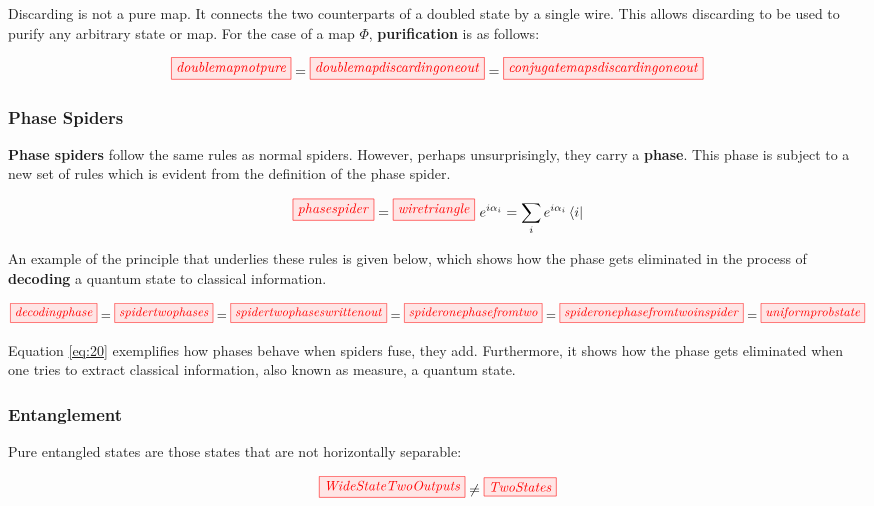 \documentclass[]{article}
\begin{document}
Discarding is not a pure map. It connects the two counterparts of a doubled state by a single wire. This allows discarding to be used to purify any arbitrary state or map. For the case of a map $\Phi$, \textbf{purification} is as follows:

\begin{equation}
\tikzfig{doublemapnotpure} = \tikzfig{doublemapdiscardingoneout} = \tikzfig{conjugatemapsdiscardingoneout}
\end{equation}



\subsubsection{Phase Spiders}
\label{phasespiders}

\textbf{Phase spiders} follow the same rules as normal spiders. However, perhaps unsurprisingly, they carry a \textbf{phase}. This phase is subject to a new set of rules which is evident from the definition of the phase spider. 

\begin{equation}
\label{phasespider}
\tikzfig{phasespider} = \tikzfig{wiretriangle}~e^{i\alpha_i} = \sum\limits_i e^{i\alpha_i} \bra{i}
\end{equation}

An example of the principle that underlies these rules is given below, which shows how the phase gets eliminated in the process of \textbf{decoding} a quantum state to classical information.


\begin{equation}
\label{eq:20}
\tikzfig{decodingphase} = \tikzfig{spidertwophases} = \tikzfig{spidertwophaseswrittenout} = \tikzfig{spideronephasefromtwo} = \tikzfig{spideronephasefromtwoinspider} =
\tikzfig{uniformprobstate}
\end{equation}

Equation \eqref{eq:20} exemplifies how phases behave when spiders fuse, they add. Furthermore, it shows how the phase gets eliminated when one tries to extract classical information, also known as measure, a quantum state.

\subsubsection{Entanglement}
\label{entanglement}
Pure entangled states are those states that are not horizontally separable: 

\begin{equation}
\tikzfig{WideStateTwoOutputs} \neq \tikzfig{TwoStates}
\end{equation}
\end{document}
